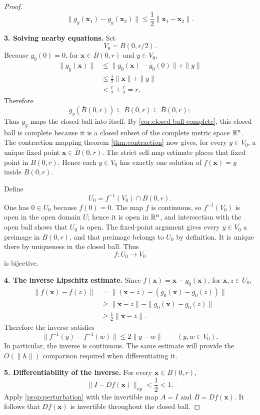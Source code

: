 \begin{proof}
\[
\|g_y(\mathbf{x}_1)-g_y(\mathbf{x}_2)\|
\leq\frac12\|\mathbf{x}_1-\mathbf{x}_2\|.
\]

\noindent\textbf{3. Solving nearby equations.}
Set
\[
V_0=B(0,r/2).
\]
Because $g_0(0)=0$, for $\mathbf{x}\in\overline B(0,r)$ and $y\in V_0$,
\[
\begin{aligned}
\|g_y(\mathbf{x})\|
&\leq\|g_0(\mathbf{x})-g_0(0)\|+\|y\|\\
&\leq\frac12\|\mathbf{x}\|+\|y\|\\
&<\frac r2+\frac r2=r.
\end{aligned}
\]
Therefore
\[
g_y(\overline B(0,r))
\subseteq B(0,r)
\subseteq\overline B(0,r);
\]
Thus $g_y$ maps the closed ball into itself. By
\cref{cor:closed-ball-complete}, this closed ball is complete because it is
a closed subset of the complete metric space $\mathbb{R}^n$. The contraction mapping
theorem \cref{thm:contraction} now gives, for every $y\in V_0$, a unique
fixed point $\mathbf{x}\in\overline B(0,r)$. The strict self-map estimate places that
fixed point in $B(0,r)$. Hence each $y\in V_0$ has exactly one solution of
$f(\mathbf{x})=y$ inside $B(0,r)$.

Define
\[
U_0=f^{-1}(V_0)\cap B(0,r).
\]
One has $0\in U_0$ because $f(0)=0$. The map $f$ is continuous, so
$f^{-1}(V_0)$ is open in the open domain $U$; hence it is open in $\mathbb{R}^n$,
and intersection with the open ball shows that $U_0$ is open. The fixed-point
argument gives every $y\in V_0$ a preimage in $B(0,r)$, and that preimage
belongs to $U_0$ by definition. It is unique there by uniqueness in the
closed ball. Thus
\[
f:U_0\longrightarrow V_0
\]
is bijective.

\noindent\textbf{4. The inverse Lipschitz estimate.}
Since $f(\mathbf{x})=\mathbf{x}-g_0(\mathbf{x})$, for $\mathbf{x},z\in U_0$,
\[
\begin{aligned}
\|f(\mathbf{x})-f(z)\|
&=\|(\mathbf{x}-z)-(g_0(\mathbf{x})-g_0(z))\|\\
&\geq\|\mathbf{x}-z\|-\|g_0(\mathbf{x})-g_0(z)\|\\
&\geq\frac12\|\mathbf{x}-z\|.
\end{aligned}
\]
Therefore the inverse satisfies
\[
\|f^{-1}(y)-f^{-1}(w)\|\leq2\|y-w\|
\qquad(y,w\in V_0).
\]
In particular, the inverse is continuous. The same estimate will provide
the $O(\|h\|)$ comparison required when differentiating it.

\noindent\textbf{5. Differentiability of the inverse.}
For every $\mathbf{x}\in\overline B(0,r)$,
\[
\|I-Df(\mathbf{x})\|_{\mathrm{op}}<\frac12<1.
\]
Apply \cref{prop:perturbation} with the
invertible map $A=I$ and $B=Df(\mathbf{x})$. It follows that $Df(\mathbf{x})$ is invertible
throughout the closed ball.


\end{proof}
